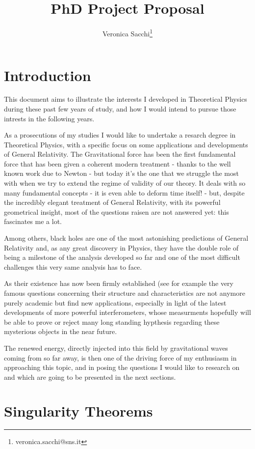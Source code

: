 \documentclass[12pt, a4paper]{article}
\title{PhD Project Proposal}
\author{Veronica Sacchi\thanks{veronica.sacchi@sns.it}}
\begin{document}
\maketitle

\section{Introduction}
This document aims to illustrate the interests I developed in Theoretical Physics during these past few years of study, and how I would intend to pursue those intrests in the following years.

As a prosecutions of my studies I would like to undertake a resarch degree in Theoretical Physics, with a specific focus on some applications and developments of General Relativity.
The Gravitational force has been the first fundamental force that has been given a coherent modern treatment - thanks to the well known work due to Newton - but today it's the one that we struggle the most with when we try to extend the regime of validity of our theory.
It deals with so many fundamental concepts -  it is even able to deform time itself! - but, despite the incredibly elegant treatment of General Relativity, with its powerful geometrical insight, most of the questions raisen are not answered yet: this fascinates me a lot.

Among others, black holes are one of the most astonishing predictions of General Relativity and, as any great discovery in Physics, they have the double role of being a milestone of the analysis developed so far and one of the most difficult challenges this very same analysis has to face.

As their existence has now been firmly established (see for example the very famous \cite{falcke1999viewing} questions concerning their structure and characteristics are not anymore purely academic but find new applications, especially in light of the latest developments of more powerful interferometers, whose measurments hopefully will be able to prove or reject many long standing hypthesis regarding these mysterious objects in the near future.

The renewed energy, directly injected into this field by gravitational waves coming from so far away, is then one of the driving force of my enthusiasm in approaching this topic, and in posing the questions I would like to research on and which are going to be presented in the next sections.

\section{Singularity Theorems}
\end{document}
